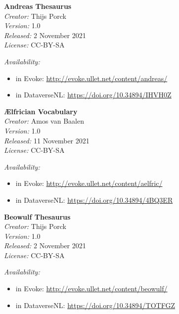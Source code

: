 \newpage

\noindent
\textbf{Andreas Thesaurus} \\
\textit{Creator:} Thijs Porck \\
\textit{Version:} 1.0 \\
\textit{Released:} 2 November 2021 \\
\textit{License:} CC-BY-SA \\
{\textit{Availability:} 
\vspace{-\topsep}
\begin{itemize}
\setlength{\itemsep}{0pt}
\setlength{\parskip}{0pt}
\setlength{\parsep}{0pt}
\item in Evoke: \url{http://evoke.ullet.net/content/andreas/}
\item in DataverseNL: \url{https://doi.org/10.34894/IHVH0Z}
\end{itemize}}
\vspace{\baselineskip}

\noindent
\textbf{Ælfrician Vocabulary} \\
\textit{Creator:} Amos van Baalen \\
\textit{Version:} 1.0 \\
\textit{Released:} 11 November 2021 \\
\textit{License:} CC-BY-SA \\
{\textit{Availability:} 
\vspace{-\topsep}
\begin{itemize}
\setlength{\itemsep}{0pt}
\setlength{\parskip}{0pt}
\setlength{\parsep}{0pt}
\item in Evoke: \url{http://evoke.ullet.net/content/aelfric/}
\item in DataverseNL: \url{https://doi.org/10.34894/4BQ3ER}
\end{itemize}}
\vspace{\baselineskip}

\noindent
\textbf{Beowulf Thesaurus} \\
\textit{Creator:} Thijs Porck \\
\textit{Version:} 1.0 \\
\textit{Released:} 2 November 2021 \\
\textit{License:} CC-BY-SA \\
{\textit{Availability:} 
\vspace{-\topsep}
\begin{itemize}
\setlength{\itemsep}{0pt}
\setlength{\parskip}{0pt}
\setlength{\parsep}{0pt}
\item in Evoke: \url{http://evoke.ullet.net/content/beowulf/}
\item in DataverseNL: \url{https://doi.org/10.34894/TOTFGZ}
\end{itemize}}
\vspace{\baselineskip}

